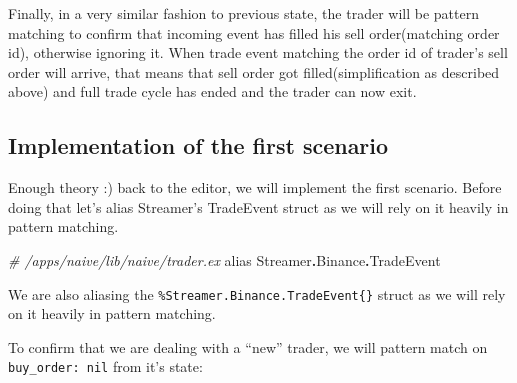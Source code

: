 \documentclass[
  oneside]{book}
\newenvironment{Shaded}{\begin{snugshade}}{\end{snugshade}}
\newcommand{\CommentTok}[1]{\textcolor[rgb]{0.56,0.35,0.01}{\textit{#1}}}
\newcommand{\ConstantTok}[1]{\textcolor[rgb]{0.00,0.00,0.00}{#1}}
\newcommand{\ImportTok}[1]{#1}
\newcommand{\OperatorTok}[1]{\textcolor[rgb]{0.81,0.36,0.00}{\textbf{#1}}}
\begin{document}
Finally, in a very similar fashion to previous state, the trader will be pattern matching to confirm that incoming event has filled his sell order(matching order id), otherwise ignoring it.
When trade event matching the order id of trader's sell order will arrive, that means that sell order got filled(simplification as described above) and full trade cycle has ended and the trader can now exit.

\hypertarget{implementation-of-the-first-scenario}{%
\subsection{Implementation of the first scenario}\label{implementation-of-the-first-scenario}}

Enough theory :) back to the editor, we will implement the first scenario. Before doing that let's alias Streamer's TradeEvent struct as we will rely on it heavily in pattern matching.

\begin{Shaded}
\begin{Highlighting}[]
  \CommentTok{\# /apps/naive/lib/naive/trader.ex}
  \ImportTok{alias} \ConstantTok{Streamer}\OperatorTok{.}\ConstantTok{Binance}\OperatorTok{.}\ConstantTok{TradeEvent}
\end{Highlighting}
\end{Shaded}

We are also aliasing the \texttt{\%Streamer.Binance.TradeEvent\{\}} struct as we will rely on it heavily in pattern matching.

To confirm that we are dealing with a ``new'' trader, we will pattern match on \texttt{buy\_order:\ nil} from it's state:
\end{document}
